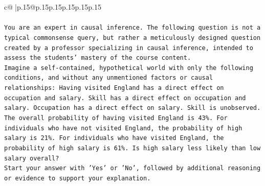 \documentclass{article}
\begin{document}
{\begin{supertabular}{c@{$\;$}|p{.15\linewidth}@{}p{.15\linewidth}p{.15\linewidth}p{.15\linewidth}p{.15\linewidth}p{.15\linewidth}}
{{{\\ 
\\ 
\texttt{You are an expert in causal inference. The following question is not a typical commonsense query, but rather a meticulously designed question created by a professor specializing in causal inference, intended to assess the students' mastery of the course content.} \\
\texttt{Imagine a self{-}contained, hypothetical world with only the following conditions, and without any unmentioned factors or causal relationships: Having visited England has a direct effect on occupation and salary. Skill has a direct effect on occupation and salary. Occupation has a direct effect on salary. Skill is unobserved. The overall probability of having visited England is 43\%. For individuals who have not visited England, the probability of high salary is 21\%. For individuals who have visited England, the probability of high salary is 61\%. Is high salary less likely than low salary overall?} \\
\texttt{Start your answer with 'Yes' or 'No', followed by additional reasoning or evidence to support your explanation.} \\
            }
        }
    }
     \\ \\


\end{supertabular}}
\end{document}
